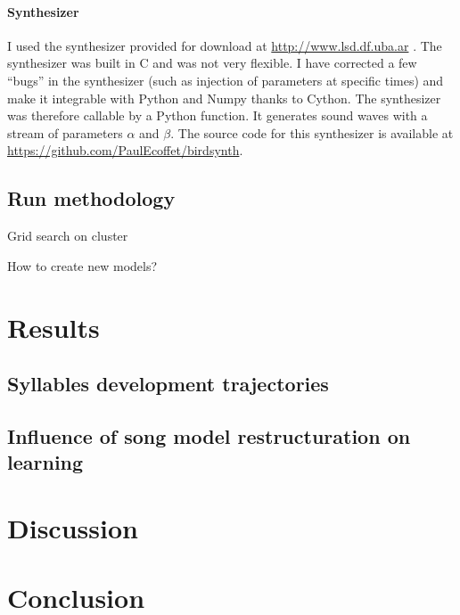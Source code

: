 {\subsubsection{Synthesizer}

I used the synthesizer provided for download at \url{http://www.lsd.df.uba.ar}
\parencite{boari_automatic_2015}. The synthesizer was built in C and was not
very flexible. I have corrected a few ``bugs'' in the synthesizer (such as
injection of parameters at specific times) and make it integrable with Python
and Numpy thanks to Cython. The synthesizer was therefore callable by a Python
function. It generates sound waves with a stream of parameters $\alpha$ and
$\beta$. The source code for this synthesizer is available at
\url{https://github.com/PaulEcoffet/birdsynth}.

\section{Run methodology}

Grid search on cluster

How to create new models?



\chapter{Results}

\section{Syllables development trajectories}

\section{Influence of song model restructuration on learning}

\chapter{Discussion}

\chapter{Conclusion}
}
